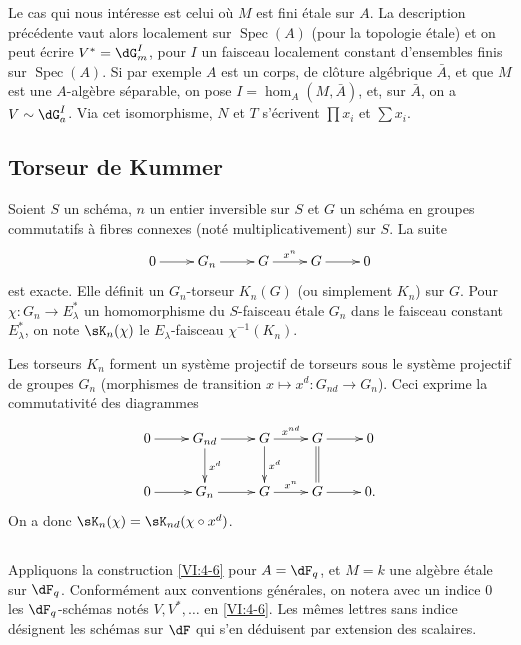 \documentclass[oneside]{book}
\DeclareMathOperator{\spec}{Spec}
\theoremstyle{sga-source}
\theoremstyle{sga-source-dash}
\theoremstyle{sga-source-dotdash}
\theoremstyle{sga-source-number-note-dash}
\theoremstyle{sga-source-note-number-dotdash}
\theoremstyle{sga-source-example-dotdash}
\theoremstyle{sga-source-inline-number}
\theoremstyle{sga-source-bare-number}
\theoremstyle{sga-source}
\newcommand{\PrintPage}[1]{}\newcommand{\MathPage}[1]{}\newcommand{\PrintCite}[2]{#1}\newcommand{\var}[3]{#1}
\begin{document}
\PrintPage{199}
Le cas qui nous intéresse est celui où $M$ est fini étale sur $A$. La 
description précédente vaut alors localement sur $\spec(A)$ (pour la 
topologie étale) et on peut écrire $V^\ast=\dG_m^I$, pour $I$ un faisceau 
localement constant d'ensembles finis sur $\spec(A)$. Si par exemple $A$ est un 
corps, de clôture algébrique $\bar A$, et que $M$ est une $A$-algèbre 
séparable, on pose $I=\hom_A(M,\bar A)$, et, sur $\bar A$, on a 
$V\sim \dG_a^I$. Via cet isomorphisme, $N$ et $T$ s'écrivent $\prod x_i$ et 
$\sum x_i$. 





\subsection{Torseur de Kummer}\label{VI:4-7}

Soient $S$ un schéma, $n$ un entier inversible sur $S$ et $G$ un schéma en 
groupes commutatifs à fibres connexes (noté multiplicativement) sur $S$. 
La suite 
\[\xymatrix{
  0 \ar[r] 
    & G_n \ar[r] 
    & G \ar[r]^-{x^n} 
    & G \ar[r] 
    & 0 
}\]
est exacte. Elle définit un $G_n$-torseur $K_n(G)$ (ou simplement $K_n$) sur 
$G$. Pour $\chi:G_n \to E_\lambda^\ast$ un homomorphisme du $S$-faisceau 
étale $G_n$ dans le faisceau constant $E_\lambda^\ast$, on note 
$\sK_n(\chi)$ le $E_\lambda$-faisceau $\chi^{-1}(K_n)$. 

Les torseurs $K_n$ forment un système projectif de torseurs sous le 
système projectif de groupes $G_n$ (morphismes de transition 
$x\mapsto x^d:G_{n d}\to G_n$). Ceci exprime la commutativité des diagrammes 
\[\xymatrix{
  0 \ar[r] 
    & G_{n d} \ar[r] \ar[d]^-{x^d} 
    & G \ar[r]^-{x^{n d}} \ar[d]^-{x^d} 
    & G \ar[r] \ar@{=}[d] 
    & 0 \\
  0 \ar[r] 
    & G_n \ar[r] 
    & G \ar[r]^-{x^n} 
    & G \ar[r] 
    & 0 \text{.} 
}\]
On a donc $\sK_n(\chi) = \sK_{n d}(\chi\circ x^d)$. 





\subsection{}\label{VI:4-8}

Appliquons la construction \ref{VI:4-6} pour $A=\dF_q$, et $M=k$ une algèbre 
étale sur $\dF_q$. Conformément aux conventions générales, on notera 
avec un indice $0$ les $\dF_q$-schémas notés $V,V^\ast,\ldots$ en 
\ref{VI:4-6}. Les mêmes lettres sans indice désignent les schémas sur 
$\dF$ qui s'en déduisent par extension des scalaires. 
\end{document}
